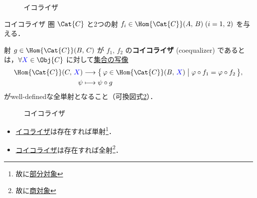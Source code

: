 \documentclass[algtopo_main]{subfiles}
\begin{document}
\begin{figure}[H]
    \centering
    \caption{イコライザ}
    \label{cmtd:equalizer}
\end{figure}%


\begin{mydef}[label=def:coequalizer]{コイコライザ}
    圏 $\Cat{C}$ と2つの射 $f_i \in \Hom{\Cat{C}}(A,\, B)\; (i=1,\, 2)$ を与える．

    射 $g \in \Hom{\Cat{C}}(B,\, C)$ が $f_1,\, f_2$ の\textbf{コイコライザ} (coequalizer) であるとは，$\forall \textcolor{blue}{X} \in \Obj{C}$ に対して\underline{集合の写像}
    \begin{align}
        \Hom{\Cat{C}}(C,\, \textcolor{blue}{X}) &\lto \bigl\{\, \varphi \in \Hom{\Cat{C}}(B,\, \textcolor{blue}{X}) \bigm| \varphi \circ f_1 = \varphi \circ f_2 \,\bigr\}, \\
        \psi &\lmto \psi \circ g
    \end{align}
    がwell-definedな全単射となること（可換図式\ref{cmtd:coequalizer}）．
\end{mydef}

\begin{figure}[H]
    \centering
    \caption{コイコライザ}
    \label{cmtd:coequalizer}
\end{figure}%


\begin{myprop}[label=prop:equalizer]{}
    \begin{itemize}
        \item \hyperref[def:equalizer]{イコライザ}は存在すれば単射\footnote{故に\hyperref[def:sub]{部分対象}}．
        \item \hyperref[def:coequalizer]{コイコライザ}は存在すれば全射\footnote{故に\hyperref[def:quo]{商対象}}．
    \end{itemize}
\end{myprop}
\end{document}
